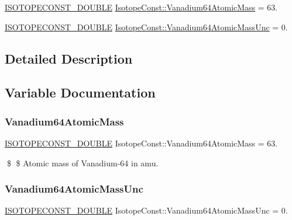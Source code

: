 \begin{DoxyCompactItemize}
\item 
\mbox{\hyperlink{group___isotope_const-_macros_ga8f45a7272ce02c0b4c65c44636ed719a}{I\+S\+O\+T\+O\+P\+E\+C\+O\+N\+S\+T\+\_\+\+D\+O\+U\+B\+LE}} \mbox{\hyperlink{group___isotope_const-_vanadium-_v64_gac57dae94ca1f47ee238562cbf3a80b2d}{Isotope\+Const\+::\+Vanadium64\+Atomic\+Mass}} = 63.
\item 
\mbox{\hyperlink{group___isotope_const-_macros_ga8f45a7272ce02c0b4c65c44636ed719a}{I\+S\+O\+T\+O\+P\+E\+C\+O\+N\+S\+T\+\_\+\+D\+O\+U\+B\+LE}} \mbox{\hyperlink{group___isotope_const-_vanadium-_v64_ga8f7a5ab7e3b201a33ea832e0110bf4b7}{Isotope\+Const\+::\+Vanadium64\+Atomic\+Mass\+Unc}} = 0.
\end{DoxyCompactItemize}


\subsection{Detailed Description}


\subsection{Variable Documentation}
\mbox{\label{group___isotope_const-_vanadium-_v64_gac57dae94ca1f47ee238562cbf3a80b2d}} 
\subsubsection{\texorpdfstring{Vanadium64\+Atomic\+Mass}{Vanadium64AtomicMass}}
{\footnotesize\ttfamily \mbox{\hyperlink{group___isotope_const-_macros_ga8f45a7272ce02c0b4c65c44636ed719a}{I\+S\+O\+T\+O\+P\+E\+C\+O\+N\+S\+T\+\_\+\+D\+O\+U\+B\+LE}} Isotope\+Const\+::\+Vanadium64\+Atomic\+Mass = 63.}

\$ \$ Atomic mass of Vanadium-\/64 in amu. \mbox{\label{group___isotope_const-_vanadium-_v64_ga8f7a5ab7e3b201a33ea832e0110bf4b7}} 
\subsubsection{\texorpdfstring{Vanadium64\+Atomic\+Mass\+Unc}{Vanadium64AtomicMassUnc}}
{\footnotesize\ttfamily \mbox{\hyperlink{group___isotope_const-_macros_ga8f45a7272ce02c0b4c65c44636ed719a}{I\+S\+O\+T\+O\+P\+E\+C\+O\+N\+S\+T\+\_\+\+D\+O\+U\+B\+LE}} Isotope\+Const\+::\+Vanadium64\+Atomic\+Mass\+Unc = 0.}


